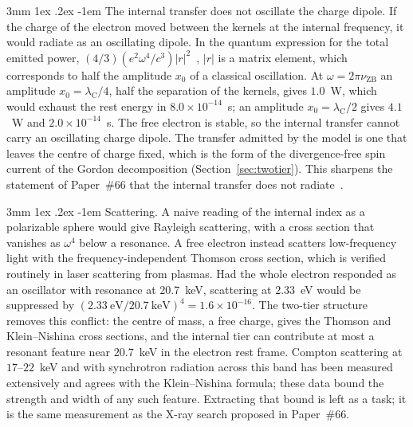 \documentclass[%
 reprint, amsmath,amssymb, aps, prb, ]{revtex4-2}
\makeatletter
\numberwithin{equation}{section}
\renewcommand\paragraph{%
  \@startsection{paragraph}{4}{\z@}%
    {3mm \@plus 1ex \@minus .2ex}%
    {-1em}%
    {\normalfont\normalsize\itshape}}
\newcommand{\lambdaC}{\lambda_{\mathrm{C}}}
\makeatother
\begin{document}
\paragraph{The internal transfer does not oscillate the charge dipole.} If the charge of the electron moved between the kernels at the internal frequency, it would radiate as an oscillating dipole. In the quantum expression for the total emitted power, $(4/3)(e^2\omega^4/c^3)|r|^2$~\cite{Yukawa1954}, $|r|$ is a matrix element, which corresponds to half the amplitude $x_0$ of a classical oscillation. At $\omega = 2\pi\nu_{\mathrm{ZB}}$ an amplitude $x_0 = \lambdaC/4$, half the separation of the kernels, gives $1.0$~W, which would exhaust the rest energy in $8.0\times10^{-14}$~s; an amplitude $x_0 = \lambdaC/2$ gives $4.1$~W and $2.0\times10^{-14}$~s. The free electron is stable, so the internal transfer cannot carry an oscillating charge dipole. The transfer admitted by the model is one that leaves the centre of charge fixed, which is the form of the divergence-free spin current of the Gordon decomposition (Section~\ref{sec:twotier}). This sharpens the statement of Paper~\#66 that the internal transfer does not radiate~\cite{H66}.

\paragraph{Scattering.} A naive reading of the internal index as a polarizable sphere would give Rayleigh scattering, with a cross section that vanishes as $\omega^4$ below a resonance. A free electron instead scatters low-frequency light with the frequency-independent Thomson cross section, which is verified routinely in laser scattering from plasmas. Had the whole electron responded as an oscillator with resonance at $20.7$~keV, scattering at $2.33$~eV would be suppressed by $(2.33\ \text{eV}/20.7\ \text{keV})^4 = 1.6\times10^{-16}$. The two-tier structure removes this conflict: the centre of mass, a free charge, gives the Thomson and Klein--Nishina cross sections, and the internal tier can contribute at most a resonant feature near $20.7$~keV in the electron rest frame. Compton scattering at $17$--$22$~keV and with synchrotron radiation across this band has been measured extensively and agrees with the Klein--Nishina formula; these data bound the strength and width of any such feature. Extracting that bound is left as a task; it is the same measurement as the X-ray search proposed in Paper~\#66.

\end{document}
